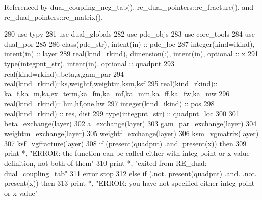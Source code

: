 Referenced by dual\+\_\+coupling\+\_\+neg\+\_\+tab(), re\+\_\+dual\+\_\+pointers\+::re\+\_\+fracture(), and re\+\_\+dual\+\_\+pointers\+::re\+\_\+matrix().


\begin{DoxyCode}
280       \textcolor{keywordtype}{use }typy
281       \textcolor{keywordtype}{use }dual_globals
282       \textcolor{keywordtype}{use }pde_objs
283       \textcolor{keywordtype}{use }core_tools
284       \textcolor{keywordtype}{use }dual_por
285           
286       \textcolor{keywordtype}{class}(pde_str), \textcolor{keywordtype}{intent(in)} :: pde\_loc 
287       \textcolor{keywordtype}{integer(kind=ikind)}, \textcolor{keywordtype}{intent(in)} :: layer
289       \textcolor{keywordtype}{real(kind=rkind)}, \textcolor{keywordtype}{dimension(:)}, \textcolor{keywordtype}{intent(in)}, \textcolor{keywordtype}{optional} :: x
291       \textcolor{keywordtype}{type}(integpnt_str), \textcolor{keywordtype}{intent(in)}, \textcolor{keywordtype}{optional} :: quadpnt
293       \textcolor{keywordtype}{real(kind=rkind)}::beta,a,gam\_par
294       \textcolor{keywordtype}{real(kind=rkind)}::ks,weightf,weightm,ksm,ksf
295       \textcolor{keywordtype}{real(kind=rkind)}:: ka\_f,ka\_m,ka,ex\_term,ka\_fm,ka\_mf,ka\_mm,ka\_ff,ka\_fw\textcolor{comment}{,ka\_mw}
296 \textcolor{comment}{      }\textcolor{keywordtype}{real(kind=rkind)}:: hm,hf,one,hw
297       \textcolor{keywordtype}{integer(kind=ikind)} :: pos
298       \textcolor{keywordtype}{real(kind=rkind)} :: res, dist
299       \textcolor{keywordtype}{type}(integpnt_str) :: quadpnt\_loc 
300 
301       beta=exchange(layer)%
302       a=exchange(layer)%
303       gam\_par=exchange(layer)%
304       weightm=exchange(layer)%
305       weightf=exchange(layer)%
306       ksm=vgmatrix(layer)%
307       ksf=vgfracture(layer)%
308       \textcolor{keywordflow}{if} (\textcolor{keyword}{present}(quadpnt) .and. \textcolor{keyword}{present}(x)) \textcolor{keywordflow}{then}
309         print *, \textcolor{stringliteral}{"ERROR: the function can be called either with integ point or x value definition, not both
       of them"}
310         print *, \textcolor{stringliteral}{"exited from RE\_dual: dual\_coupling\_tab"}
311         error stop
312       \textcolor{keywordflow}{else} \textcolor{keywordflow}{if} (.not. \textcolor{keyword}{present}(quadpnt) .and. .not. \textcolor{keyword}{present}(x)) \textcolor{keywordflow}{then}
313         print *, \textcolor{stringliteral}{"ERROR: you have not specified either integ point or x value"}

\end{DoxyCode}
